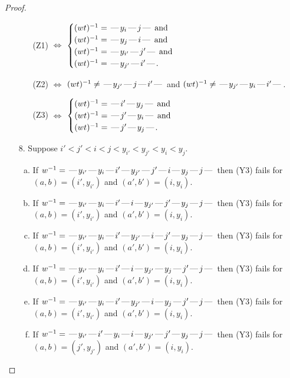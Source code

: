 \documentclass[10pt]{article}
\theoremstyle{definition}
\theoremstyle{definition}
\def\dash{\text{\hspace{0.5mm}---\hspace{0.5mm}}}
\begin{document}
\begin{proof}
\begin{enumerate}
\begin{enumerate}
\item[](Z1) $\Leftrightarrow$ $\begin{cases}\text{$(wt)^{-1} = \dash y_i \dash j \dash$}\text{ and }\\
\text{$(wt)^{-1} = \dash y_j \dash i \dash$}\text{ and }\\
\text{$(wt)^{-1} = \dash y_{i'} \dash j' \dash$}\text{ and }\\
\text{$(wt)^{-1} = \dash y_{j'} \dash i' \dash$}.\end{cases}$
\item[](Z2) $\Leftrightarrow$ $(wt)^{-1} \neq \dash y_{j'} \dash j \dash i' \dash$ and $(wt)^{-1}\neq \dash y_{j'} \dash y_i \dash i' \dash$.
\item[](Z3) $\Leftrightarrow$ $\begin{cases}\text{$(wt)^{-1} = \dash i' \dash y_j \dash$}\text{ and }\\
\text{$(wt)^{-1} = \dash j' \dash y_i \dash$}\text{ and }\\
\text{$(wt)^{-1} = \dash j' \dash y_j \dash$}.\end{cases}$
\end{enumerate}
\item[$8$.] Suppose $i' < j' < i < j < y_{i'} < y_{j'} < y_i < y_j$.
\begin{enumerate}[(a)]
\item If $w^{-1} = \dash y_{i'}\dash y_i\dash i'\dash y_{j'}\dash j'\dash i\dash y_j\dash j\dash $ then (Y3) fails for $(a,b)=(i',y_{i'})$ and $(a',b')=(i,y_i)$.
\item If $w^{-1} = \dash y_{i'}\dash y_i\dash i'\dash i\dash y_{j'}\dash j'\dash y_j\dash j\dash $ then (Y3) fails for $(a,b)=(i',y_{i'})$ and $(a',b')=(i,y_i)$.
\item If $w^{-1} = \dash y_{i'}\dash y_i\dash i'\dash y_{j'}\dash i\dash j'\dash y_j\dash j\dash $ then (Y3) fails for $(a,b)=(i',y_{i'})$ and $(a',b')=(i,y_i)$.
\item If $w^{-1} = \dash y_{i'}\dash y_i\dash i'\dash i\dash y_{j'}\dash y_j\dash j'\dash j\dash $ then (Y3) fails for $(a,b)=(i',y_{i'})$ and $(a',b')=(i,y_i)$.
\item If $w^{-1} = \dash y_{i'}\dash y_i\dash i'\dash y_{j'}\dash i\dash y_j\dash j'\dash j\dash $ then (Y3) fails for $(a,b)=(i',y_{i'})$ and $(a',b')=(i,y_i)$.
\item If $w^{-1} = \dash y_{i'}\dash i'\dash y_i\dash i\dash y_{j'}\dash j'\dash y_j\dash j\dash $ then (Y3) fails for $(a,b)=(j',y_{j'})$ and $(a',b')=(i,y_i)$.

\end{enumerate}
\end{enumerate}
\end{proof}
\end{document}
